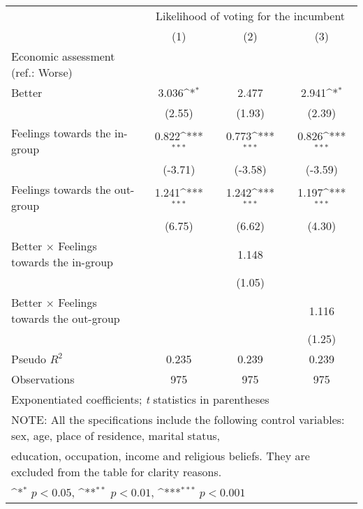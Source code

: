 {
\def\sym#1{\ifmmode^{#1}\else\(^{#1}\)\fi}
\begin{tabular}{l*{3}{c}}
\toprule
                &\multicolumn{3}{c}{Likelihood of voting for the incumbent}\\\cmidrule(lr){2-4}
                &\multicolumn{1}{c}{(1)}         &\multicolumn{1}{c}{(2)}         &\multicolumn{1}{c}{(3)}         \\
\midrule
Economic assessment (ref.: Worse)&                  &                  &                  \\
Better          &    3.036\sym{*}  &    2.477         &    2.941\sym{*}  \\
                &   (2.55)         &   (1.93)         &   (2.39)         \\
Feelings towards the in-group&    0.822\sym{***}&    0.773\sym{***}&    0.826\sym{***}\\
                &  (-3.71)         &  (-3.58)         &  (-3.59)         \\
Feelings towards the out-group&    1.241\sym{***}&    1.242\sym{***}&    1.197\sym{***}\\
                &   (6.75)         &   (6.62)         &   (4.30)         \\
Better $\times$ Feelings towards the in-group&                  &    1.148         &                  \\
                &                  &   (1.05)         &                  \\
Better $\times$ Feelings towards the out-group&                  &                  &    1.116         \\
                &                  &                  &   (1.25)         \\
\midrule
Pseudo \(R^{2}\)&    0.235         &    0.239         &    0.239         \\
Observations    &      975         &      975         &      975         \\
\bottomrule
\multicolumn{4}{l}{\footnotesize Exponentiated coefficients; \textit{t} statistics in parentheses}\\
\multicolumn{4}{l}{\footnotesize NOTE: All the specifications include the following control variables: sex, age, place of residence, marital status,}\\
\multicolumn{4}{l}{\footnotesize education, occupation, income and religious beliefs. They are excluded from the table for clarity reasons.}\\
\multicolumn{4}{l}{\footnotesize \sym{*} \(p<0.05\), \sym{**} \(p<0.01\), \sym{***} \(p<0.001\)}\\
\end{tabular}
}
